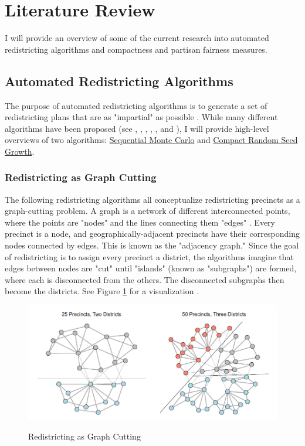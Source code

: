 \section{Literature Review}
\label{sec:litreview}

I will provide an overview of some of the current research into automated redistricting algorithms and compactness and partisan fairness measures. 

\subsection{Automated Redistricting Algorithms}

The purpose of automated redistricting algorithms is to generate a set of redistricting plans that are as "impartial" as possible \parencite{chen2013}. While many different algorithms have been proposed (see \textcite{altman2009}, \textcite{haas2020}, \textcite{lara-caballero2019}, \textcite{macmillan2001}, \textcite{weaver1963}, and \textcite{xiao2008}), I will provide high-level overviews of two algorithms: \hyperref[sec:smc]{Sequential Monte Carlo} and \hyperref[sec:crsg]{Compact Random Seed Growth}. 

\subsubsection{Redistricting as Graph Cutting}
\label{sec:redistasgraphcut}


The following redistricting algorithms all conceptualize redistricting precincts as a graph-cutting problem. A graph is a network of different interconnected points, where the points are "nodes" and the lines connecting them "edges" \parencite{fifield2020}. Every precinct is a node, and geographically-adjacent precincts have their corresponding nodes connected by edges. This is known as the "adjacency graph." Since the goal of redistricting is to assign every precinct a district, the algorithms imagine that edges between nodes are "cut" until "islands" (known as "subgraphs") are formed, where each is disconnected from the others. The disconnected subgraphs then become the districts. See Figure \ref{fig:graphcut} for a visualization \parencite{fifield2020}. 

\begin{figure}[ht]
    \caption{Redistricting as Graph Cutting}
    \includegraphics[width=0.8\linewidth]{img/graphcut.png}
    \label{fig:graphcut}
    \raggedright
\end{figure} 

